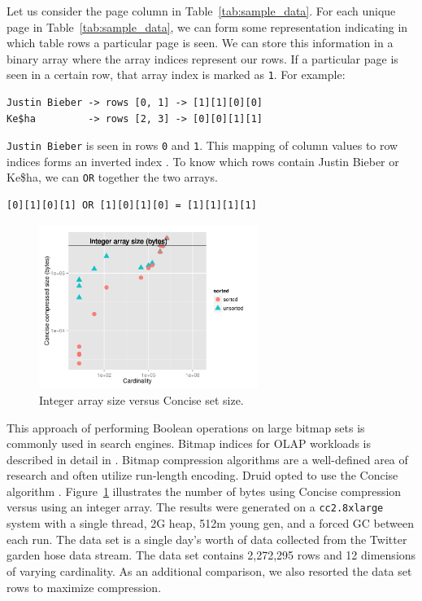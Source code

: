\documentclass{sig-alternate-2013}
\begin{document}
Let us consider the page column in
Table~\ref{tab:sample_data}. For each unique page in
Table~\ref{tab:sample_data}, we can form some representation
indicating in which table rows a particular page is seen. We can
store this information in a binary array where the array indices
represent our rows. If a particular page is seen in a certain
row, that array index is marked as \texttt{1}. For example:
{\small\begin{verbatim}
Justin Bieber -> rows [0, 1] -> [1][1][0][0]
Ke$ha         -> rows [2, 3] -> [0][0][1][1]
\end{verbatim}}

\texttt{Justin Bieber} is seen in rows \texttt{0} and \texttt{1}. This mapping of column values
to row indices forms an inverted index \cite{tomasic1993performance}. To know which
rows contain {\ttfamily Justin Bieber} or {\ttfamily Ke\$ha}, we can \texttt{OR} together
the two arrays.
{\small\begin{verbatim}
[0][1][0][1] OR [1][0][1][0] = [1][1][1][1]
\end{verbatim}}

\begin{figure}
\centering
\includegraphics[width = 2.8in]{concise_plot}
\caption{Integer array size versus Concise set size.}
\label{fig:concise_plot}
\end{figure}

This approach of performing Boolean operations on large bitmap sets is commonly
used in search engines. Bitmap indices for OLAP workloads is described in
detail in \cite{o1997improved}. Bitmap compression algorithms are a
well-defined area of research \cite{antoshenkov1995byte, wu2006optimizing,
van2011memory} and often utilize run-length encoding. Druid opted to use the
Concise algorithm \cite{colantonio2010concise}. Figure~\ref{fig:concise_plot}
illustrates the number of bytes using Concise compression versus using an
integer array. The results were generated on a \texttt{cc2.8xlarge} system with
a single thread, 2G heap, 512m young gen, and a forced GC between each run. The
data set is a single day’s worth of data collected from the Twitter garden hose
\cite{twitter2013} data stream. The data set contains 2,272,295 rows and 12
dimensions of varying cardinality. As an additional comparison, we also
resorted the data set rows to maximize compression.
\end{document}
